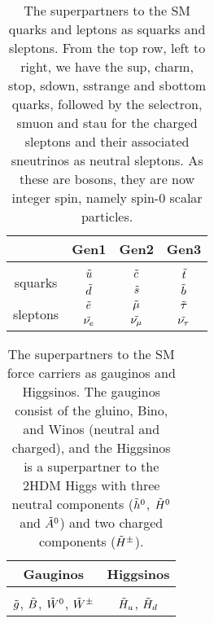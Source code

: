 \begin{table}[htbp]
    \centering
    \begin{tabular}{c||c|c|c}
    \toprule
    & Gen1 & Gen2 & Gen3 \\
    \midrule
    & \\[-2.7ex]
    \multirow{2}{1.4cm}{squarks} & $\Tilde{u}$ & $\Tilde{c}$ & \small$\Tilde{t}$ \\
     & $\Tilde{d}$ & $\Tilde{s}$ & $\Tilde{b}$ \\
    \midrule
    
    \multirow{2}{1.4cm}{sleptons} & $\Tilde{e}$ & $\Tilde{\mu}$ & $\Tilde{\tau}$ \\
     & $\Tilde{\nu_e}$ & $\Tilde{\nu_\mu}$ & $\Tilde{\nu_\tau}$ \\
    \bottomrule
    \end{tabular}
    \caption{The superpartners to the SM quarks and leptons as squarks and sleptons. From the top row, left to right, we have the sup, charm, stop, sdown, sstrange and sbottom quarks, followed by the selectron, smuon and stau for the charged sleptons and their associated sneutrinos as neutral sleptons. As these are bosons, they are now integer spin, namely spin-0 scalar particles.}
    \label{tab:SUSYspart}
\end{table}

\begin{table}[htbp]
    \centering
    \begin{tabular}{c|c}
    \toprule
       Gauginos  & Higgsinos \\
       \midrule
        & \\[-2.5ex]
      $\Tilde{g}$, $\Tilde{B}$, $\Tilde{W}^0$, $\Tilde{W}^\pm$ & $\Tilde{H}_u$,  $\Tilde{H}_d$ \\
     \bottomrule
    \end{tabular}
    \caption{The superpartners to the SM force carriers as gauginos and Higgsinos. The gauginos consist of the gluino, Bino, and Winos (neutral and charged), and the Higgsinos is a superpartner to the 2HDM Higgs with three neutral components ($\Tilde{h}^0$, $\Tilde{H}^0$ and $\Tilde{A}^0$) and two charged components ($\Tilde{H}^\pm$).}
    \label{tab:SUSYinos}
\end{table}

